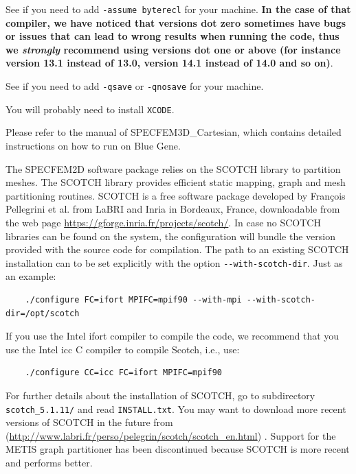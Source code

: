 \documentclass[oneside,english,onecolumn,letterpaper]{book}
\newcommand{\urlwithparentheses}[1]{(\url{#1})}
\begin{document}
\begin{description}[font=\ttfamily]
\item [Intel ifort compiler] See if you need to add \texttt{-assume byterecl} for your machine. \textbf{In the case of that compiler, we have noticed that versions dot zero sometimes have bugs or issues that can lead to wrong results when running the code, thus we \emph{strongly} recommend using versions dot one or above (for instance version 13.1 instead of 13.0, version 14.1 instead of 14.0 and so on)}.
\item [IBM compiler] See if you need to add \texttt{-qsave} or \texttt{-qnosave} for your machine.
\item [Mac OS] You will probably need to install \texttt{XCODE}.
\item [IBM Blue Gene machines] Please refer to the manual of SPECFEM3D\_Cartesian, which contains detailed instructions on how to run on Blue Gene.
\end{description}

The SPECFEM2D software package relies on the SCOTCH library to partition meshes.
The SCOTCH library \citep{PeRo96}
provides efficient static mapping, graph and mesh partitioning routines. SCOTCH is a free software package developed by
Fran\c{c}ois Pellegrini et al. from LaBRI and Inria in Bordeaux, France, downloadable from the web page \url{https://gforge.inria.fr/projects/scotch/}.
In case no SCOTCH libraries can be found on the system, the configuration will bundle the version provided with the source code for compilation.
The path to an existing SCOTCH installation can to be set explicitly with the option \texttt{-{}-with-scotch-dir}.
Just as an example:
%
\begin{verbatim}
    ./configure FC=ifort MPIFC=mpif90 --with-mpi --with-scotch-dir=/opt/scotch
\end{verbatim}
%
If you use the Intel ifort compiler to compile the code, we recommend that you use the Intel icc C compiler to compile Scotch, i.e., use:
%
\begin{verbatim}
    ./configure CC=icc FC=ifort MPIFC=mpif90
\end{verbatim}
%
For further details about the installation of SCOTCH,
go to subdirectory \texttt{scotch\_5.1.11/} and read \texttt{INSTALL.txt}. You may want to download more recent versions of SCOTCH in the future from \urlwithparentheses{http://www.labri.fr/perso/pelegrin/scotch/scotch_en.html} . Support for the METIS graph partitioner has been discontinued because SCOTCH is more recent and performs better.
\end{document}
